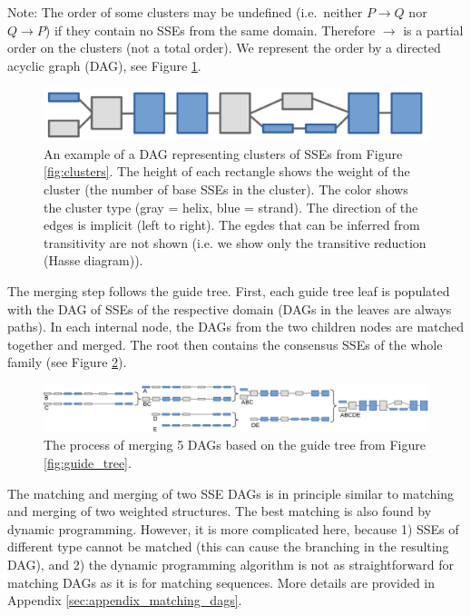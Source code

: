 \documentclass{article}
\begin{document}
Note: The order of some clusters may be undefined (i.e.~neither 
\(P \rightarrow Q\) nor \(Q \rightarrow P\)) if they contain no SSEs 
from the same domain. Therefore \(\rightarrow\) is a partial order on the clusters (not a total order).
We represent the order by a directed acyclic graph (DAG), see Figure \ref{fig:dag_example}.

\begin{figure}[h!]
  \centering\includegraphics[width=0.6\linewidth]{figures/dag_ABCDE.png}
  \caption{An example of a DAG representing clusters of SSEs from Figure \ref{fig:clusters}. 
  The height of each rectangle shows the weight of the cluster (the number of base SSEs in the cluster).
  The color shows the cluster type (gray = helix, blue = strand).
  The direction of the edges is implicit (left to right).
  The egdes that can be inferred from transitivity are not shown 
  (i.e. we show only the transitive reduction (Hasse diagram)). }
  \label{fig:dag_example}
\end{figure}

The merging step follows the guide tree. First, each guide tree leaf is
populated with the DAG of SSEs of the respective domain (DAGs in the leaves are always paths). 
In each internal node, the DAGs from the two children nodes are matched together and merged. 
The root then contains the consensus SSEs of the whole family (see Figure \ref{fig:dag_merging}). 

\begin{figure}[h!]
  \centering\includegraphics[width=\linewidth]{figures/dag_merging.png}
  \caption{The process of merging 5 DAGs based on the guide tree from Figure \ref{fig:guide_tree}.}
  \label{fig:dag_merging}
\end{figure}

The matching and merging of two SSE DAGs is in principle similar to matching
and merging of two weighted structures. 
The best matching is also found by dynamic programming.
However, it is more complicated here, because 
1) SSEs of different type cannot be matched (this can cause the
branching in the resulting DAG), 
and 2) the dynamic programming algorithm is not as straightforward 
for matching DAGs as it is for matching sequences.
More details are provided in Appendix \ref{sec:appendix_matching_dags}.
\end{document}

